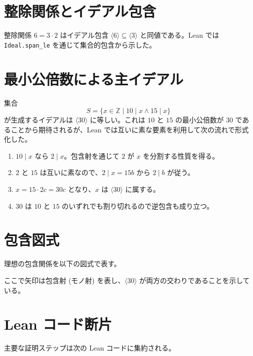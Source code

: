 \documentclass[a4paper]{ltjsarticle}
\theoremstyle{definition}
\theoremstyle{plain}
\theoremstyle{remark}
\begin{document}
\section{整除関係とイデアル包含}
整除関係 $6=3\cdot 2$ はイデアル包含 $\langle 6 \rangle \subseteq \langle 3 \rangle$ と同値である。Lean では \texttt{Ideal.span\_le} を通じて集合的包含から示した。

\section{最小公倍数による主イデアル}
集合
\[
  S = \{ x\in\mathbb{Z} \mid 10\mid x \land 15\mid x \}
\]
が生成するイデアルは $\langle 30 \rangle$ に等しい。これは $10$ と $15$ の最小公倍数が $30$ であることから期待されるが、Lean では互いに素な要素を利用して次の流れで形式化した。

\begin{enumerate}[label=\textbf{(\alph*)}]
  \item $10\mid x$ なら $2\mid x$。包含射を通じて $2$ が $x$ を分割する性質を得る。
  \item $2$ と $15$ は互いに素なので、$2\mid x=15b$ から $2\mid b$ が従う。
  \item $x=15\cdot 2c = 30c$ となり、$x$ は $\langle 30 \rangle$ に属する。
  \item $30$ は $10$ と $15$ のいずれでも割り切れるので逆包含も成り立つ。
\end{enumerate}

\section{包含図式}
理想の包含関係を以下の図式で表す。

\begin{center}
\end{center}

ここで矢印は包含射 (モノ射) を表し、$\langle 30 \rangle$ が両方の交わりであることを示している。

\section{Lean コード断片}
主要な証明ステップは次の Lean コードに集約される。
\end{document}
